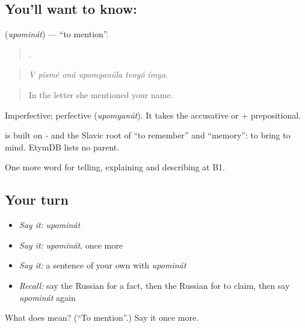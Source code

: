 \subsection*{You'll want to know: }
\textbf{} (\emph{upominát}) — \textquotedblleft{}to mention\textquotedblright{}.

\begin{quote}
     .
\end{quote}

\begin{quote}
\emph{V pismé oná upomyanúla tvoyó ímya.}
\end{quote}

\begin{quote}
In the letter she mentioned your name.
\end{quote}

Imperfective; perfective \emph{} (\emph{upomyanút}). It takes the accusative or \emph{} + prepositional.

\begin{cousinweb}
\emph{} is built on \emph{-} and the Slavic root of \emph{} \textquotedblleft{}to remember\textquotedblright{} and \emph{} \textquotedblleft{}memory\textquotedblright{}: to bring to mind. EtymDB lists no parent.
\end{cousinweb}

\begin{grammarlens}[title={What you've built}]
One more word for telling, explaining and describing at B1.
\end{grammarlens}

\subsection*{Your turn}
\begin{itemize}
\raggedright
  \item \emph{Say it:} \emph{upominát}
  \item \emph{Say it:} \emph{upominát}, once more
  \item \emph{Say it:} a sentence of your own with \emph{upominát}
  \item \emph{Recall:} say the Russian for a fact, then the Russian for to claim, then say \emph{upominát} again
\end{itemize}

\begin{tcolorbox}[breakable,colback=teal!4,colframe=teal!35!black,title={Before you move on}]
What does  mean? (\textquotedblleft{}To mention\textquotedblright{}.) Say it once more.
\end{tcolorbox}
